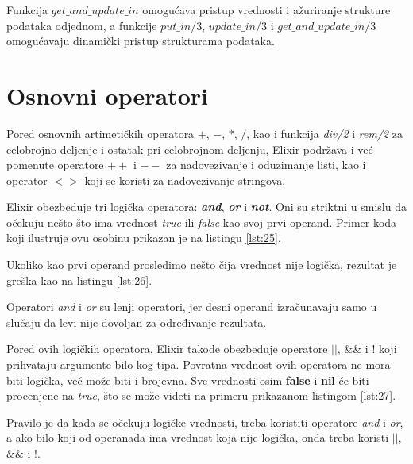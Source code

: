 \documentclass[12pt,oneside]{memoir}
\begin{document}
Funkcija $get\_and\_update\_in$ omogućava pristup vrednosti i ažuriranje strukture podataka odjednom, a funkcije $put\_in/3$, $update\_in/3$ i $get\_and\_update\_in/3$ omogućavaju dinamički pristup strukturama podataka.



\section{Osnovni operatori}

Pored osnovnih artimetičkih operatora $+$, $-$, $*$, $/$, kao i funkcija \textit{div/2} i \textit{rem/2} za celobrojno deljenje i ostatak pri celobrojnom deljenju, Elixir podržava i već pomenute operatore $++$ i $--$ za nadovezivanje i oduzimanje listi, kao i operator $<>$ koji se koristi za nadovezivanje stringova.

Elixir obezbeđuje tri logička operatora: \textit{\textbf{and}}, \textit{\textbf{or}} i \textit{\textbf{not}}. Oni su striktni u smislu da očekuju nešto što ima vrednost \textit{true} ili \textit{false} kao svoj prvi operand. Primer koda koji ilustruje ovu osobinu prikazan je na listingu \ref{lst:25}.



\noindent Ukoliko kao prvi operand prosledimo nešto čija vrednost nije logička, rezultat je greška kao na listingu \ref{lst:26}.



\noindent Operatori \textit{and} i \textit{or} su lenji operatori, jer desni operand izračunavaju samo u slučaju da levi nije dovoljan za određivanje rezultata.

Pored ovih logičkih operatora, Elixir takođe obezbeđuje operatore $||$, $\&\&$ i $!$ koji prihvataju argumente bilo kog tipa. Povratna vrednost ovih operatora ne mora biti logička, već može biti i brojevna. Sve vrednosti osim \textbf{false} i \textbf{nil} će biti procenjene na \textit{true}, što se može videti na primeru prikazanom listingom \ref{lst:27}.



Pravilo je da kada se očekuju logičke vrednosti, treba koristiti operatore \textit{and} i \textit{or}, a ako bilo koji od operanada ima vrednost koja nije logička, onda treba koristi $||$, $\&\&$ i $!$.
\end{document}
